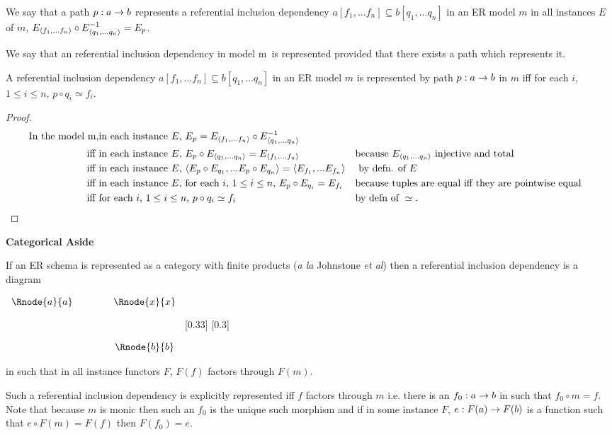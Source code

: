 \documentclass[10pt,a4paper]{article}
\newenvironment{categoricalaside}
{\begin{framed}
\textbf{Categorical Aside}
}
{
\end{framed}
}
\newcommand{\genericmodel}{\mathcal{M}}
\renewcommand{\genericmodel}{{m}}
\newcommand{\inc}{\subseteq}
\newcommand{\incd}[4]{#1\left[#2\right]\inc#3\left[#4\right]}
\newcommand{\ntuple}[1]{\tuple{#1_1,...#1_n}}
\newcommand {\fntuple}{\ensuremath{\ntuple{f}}}
\newcommand {\qntuple}{\ensuremath{\ntuple{q}}}
\newcommand{\foreachi}[1][n]{for each $i$, $1 \leq i \leq #1$}
\begin{document}
\begin{definition}
We say that a path $p:a \rightarrow b$ represents a referential inclusion dependency
$\incd{a}{f_1,...f_n}{b}{q_1,...q_n}$  in an ER model $\genericmodel$ 
  in all instances $E$ of $\genericmodel$, $E_{\fntuple} \circ E_{\qntuple}^{-1}=E_p$.
\end{definition}
We say that an referential inclusion dependency in model \genericmodel\ is represented provided that
there exists a path which represents it. 
\begin{lemma}
\label{refinclusionlemma}
A referential inclusion dependency
$\incd{a}{f_1,...f_n}{b}{q_1,...q_n}$  in an ER model $\genericmodel$ is  represented 
by path $p:a \rightarrow b$ in $\genericmodel$ iff  \foreachi, $p \circ q_i \simeq f_i$.
\end{lemma}
\begin{proof}
\begin{align*}
\text{In the model \genericmodel,}
            &\text{in each instance $E$, }E_p = E_{\fntuple} \circ E_{\qntuple}^{-1}  \\
\text{iff } & \text{in each instance $E$, } E_p \circ E_{\qntuple} = E_{\fntuple}  
                        && \text{because } E_{\qntuple} \text{ injective and total}   \\
\text{iff } & \text{in each instance $E$, } \tuple{E_p \circ E_{q_1},...E_p \circ E_{q_n}} 
                                                      = \tuple{E_{f_1},...E_{f_n}}
									                                            && \text{ by defn. of }E \\
\text{iff } & \text{in each instance $E$, \foreachi, } E_p \circ E_{q_i} = E_{f_i} 
                                                              && \text{because tuples are equal iff they are pointwise equal}  \\
\text{iff } & \text{\foreachi, } p \circ q_i \simeq f_i          && \text{by defn of } \simeq.
\end{align*}
\end{proof}


\begin{categoricalaside}
If an ER schema is represented as a category with finite products (\textit{a la} Johnstone \textit{et al}) then
a referential inclusion dependency is a  diagram
\begin{center}
$
\begin{array}{cp{0.75cm}c}
   \Rnode{a}{a}     & & \Rnode{x}{x}  \\[1.2cm]     
	                  & & \Rnode{b}{b}  
\end{array}
$
[0.33]
[0.3]
\idcomp
\end{center}
\noindent
in  such that in all instance functors $F$, 
$F(f)$ factors through $F(m)$.

Such a referential inclusion dependency is explicitly represented iff
 $f$ factors through $m$ i.e. there is an $f_0: a \rightarrow b$ in  such that 
$f_0 \circ m =f$. Note that because $m$ is monic then such an $f_0$ is the unique such morphism and if in some instance $F$,
$e: F(a) \rightarrow F(b)$ is a function such that $e \circ F(m) = F(f)$ then $F(f_0)=e$. 
\end{categoricalaside}
\end{document}
